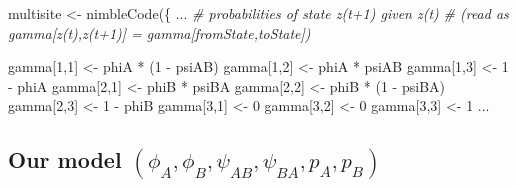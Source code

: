 \documentclass[
  12pt,
]{krantz}
\newenvironment{Shaded}{\begin{snugshade}}{\end{snugshade}}
\newcommand{\CommentTok}[1]{\textcolor[rgb]{0.56,0.35,0.01}{\textit{#1}}}
\newcommand{\DecValTok}[1]{\textcolor[rgb]{0.00,0.00,0.81}{#1}}
\newcommand{\FunctionTok}[1]{\textcolor[rgb]{0.00,0.00,0.00}{#1}}
\newcommand{\NormalTok}[1]{#1}
\newcommand{\OtherTok}[1]{\textcolor[rgb]{0.56,0.35,0.01}{#1}}
\newcommand{\SpecialCharTok}[1]{\textcolor[rgb]{0.00,0.00,0.00}{#1}}
\begin{document}
\begin{Shaded}
\begin{Highlighting}[]
\NormalTok{multisite }\OtherTok{\textless{}{-}} \FunctionTok{nimbleCode}\NormalTok{(\{}
\NormalTok{...}
  \CommentTok{\# probabilities of state z(t+1) given z(t)}
  \CommentTok{\# (read as gamma[z(t),z(t+1)] = gamma[fromState,toState])}

\NormalTok{  gamma[}\DecValTok{1}\NormalTok{,}\DecValTok{1}\NormalTok{] }\OtherTok{\textless{}{-}}\NormalTok{ phiA }\SpecialCharTok{*}\NormalTok{ (}\DecValTok{1} \SpecialCharTok{{-}}\NormalTok{ psiAB)}
\NormalTok{  gamma[}\DecValTok{1}\NormalTok{,}\DecValTok{2}\NormalTok{] }\OtherTok{\textless{}{-}}\NormalTok{ phiA }\SpecialCharTok{*}\NormalTok{ psiAB}
\NormalTok{  gamma[}\DecValTok{1}\NormalTok{,}\DecValTok{3}\NormalTok{] }\OtherTok{\textless{}{-}} \DecValTok{1} \SpecialCharTok{{-}}\NormalTok{ phiA}
\NormalTok{  gamma[}\DecValTok{2}\NormalTok{,}\DecValTok{1}\NormalTok{] }\OtherTok{\textless{}{-}}\NormalTok{ phiB }\SpecialCharTok{*}\NormalTok{ psiBA}
\NormalTok{  gamma[}\DecValTok{2}\NormalTok{,}\DecValTok{2}\NormalTok{] }\OtherTok{\textless{}{-}}\NormalTok{ phiB }\SpecialCharTok{*}\NormalTok{ (}\DecValTok{1} \SpecialCharTok{{-}}\NormalTok{ psiBA)}
\NormalTok{  gamma[}\DecValTok{2}\NormalTok{,}\DecValTok{3}\NormalTok{] }\OtherTok{\textless{}{-}} \DecValTok{1} \SpecialCharTok{{-}}\NormalTok{ phiB}
\NormalTok{  gamma[}\DecValTok{3}\NormalTok{,}\DecValTok{1}\NormalTok{] }\OtherTok{\textless{}{-}} \DecValTok{0}
\NormalTok{  gamma[}\DecValTok{3}\NormalTok{,}\DecValTok{2}\NormalTok{] }\OtherTok{\textless{}{-}} \DecValTok{0}
\NormalTok{  gamma[}\DecValTok{3}\NormalTok{,}\DecValTok{3}\NormalTok{] }\OtherTok{\textless{}{-}} \DecValTok{1}
\NormalTok{...}
\end{Highlighting}
\end{Shaded}

\hypertarget{our-model-phi_a-phi_b-psi_ab-psi_ba-p_a-p_b-4}{%
\subsection{\texorpdfstring{Our model \((\phi_A, \phi_B, \psi_{AB}, \psi_{BA}, p_A, p_B)\)}{Our model (\textbackslash phi\_A, \textbackslash phi\_B, \textbackslash psi\_\{AB\}, \textbackslash psi\_\{BA\}, p\_A, p\_B)}}\label{our-model-phi_a-phi_b-psi_ab-psi_ba-p_a-p_b-4}}
\end{document}
